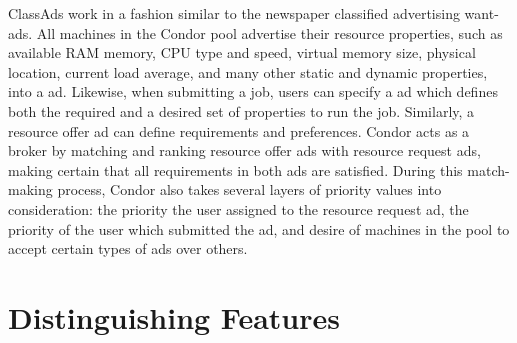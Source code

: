 ClassAds work in a fashion similar to the newspaper classified
advertising want-ads. All machines in the Condor pool advertise their
resource properties, such as available RAM memory, CPU type and speed,
virtual memory size, physical location, current load average, and many
other static and dynamic properties, into a  ad.
Likewise,
when submitting a job, users can specify a  ad
which
defines both the required and a desired set of properties to run the job.
Similarly, a resource offer ad can define requirements and preferences.
Condor acts as a broker by matching and ranking resource
offer ads with resource request ads, making certain that all
requirements in both ads are satisfied. During this match-making
process, Condor also takes several layers of priority values into
consideration: the priority the user assigned to the resource request
ad, the priority of the user which submitted the ad, and desire of
machines in the pool to accept certain types of ads over others. 

\section{Distinguishing Features}

